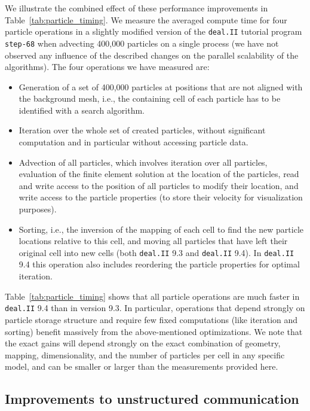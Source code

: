 \documentclass{ansarticle-preprint}
\newcommand{\specialword}[1]{\texttt{#1}}
\newcommand{\dealii}{{\specialword{deal.II}}\xspace}
\begin{document}
We illustrate the combined effect of these performance improvements in Table~\ref{tab:particle_timing}. We measure the averaged compute time for four particle operations in a slightly modified version of the \dealii tutorial program \texttt{step-68} when advecting 400,000 particles on a single process (we have not observed any influence of the described changes on the parallel scalability of the algorithms).
The four operations we have measured are:
\begin{itemize}
\item Generation of a set of 400,000 particles at positions that are not aligned with the background mesh, i.e., the containing cell of each particle has to be identified with a search algorithm.
\item Iteration over the whole set of created particles, without
  significant computation and in particular without accessing particle data.
\item Advection of all particles, which involves iteration over all particles, evaluation of the finite element solution at the location of the particles, read and write access to the position of all particles to modify their location, and write access to the particle properties (to store their velocity for visualization purposes).
\item Sorting, i.e., the inversion of the mapping of each cell to find the new particle locations relative to this cell, and moving all particles that have left their original cell into new cells (both \dealii 9.3 and \dealii 9.4). In \dealii 9.4 this operation also includes reordering the particle properties for optimal iteration.
\end{itemize}

Table~\ref{tab:particle_timing} shows that all particle operations are
much faster in \dealii 9.4 than in version 9.3. In particular, operations that depend strongly on particle storage structure and require few fixed computations (like iteration and sorting) benefit massively from the above-mentioned optimizations. We note that the exact gains will depend strongly on the exact combination of geometry, mapping, dimensionality, and the number of particles per cell in any specific model, and can be smaller or larger than the measurements provided here.


\subsection{Improvements to unstructured communication}
\label{sec:CA}
\end{document}
